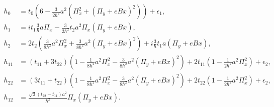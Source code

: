 \documentclass{report}
\newcommand{\f}[2]{\dfrac{#1}{#2}}
\begin{document}
\begin{equation}
	\begin{aligned}
		h_{0}  & = t_{0} (6 - \frac{3}{2\hbar^{2}} a^{2} (\Pi_{x}^{2} + (\Pi_{y} + e Bx)^{2})) + \epsilon_{1}  ,                                                                                          \\
		h_{1}  & = i t_{1} \frac{3}{\hbar}a \Pi_{x} - \frac{3}{2\hbar^{2}} t_{2} a^{2} \Pi_{x}(\Pi_{y} + eBx)       ,                                                                                     \\
		h_{2}  & = 2 t_{2} (\frac{3}{8\hbar^{2}} a^{2} \Pi_{x}^{2} + \frac{3}{8\hbar^{2}} a^{2} (\Pi_{y} + eBx)^{2}) + i \frac{3}{\hbar} t_{1} a (\Pi_{y} + eBx)     ,                                    \\
		h_{11} & = (t_{11} + 3 t_{22}) (1 - \frac{1}{8\hbar^{2}}a^{2} \Pi_{x}^{2} - \frac{3}{8\hbar^{2}}a^{2} (\Pi_{y} + eBx)^{2}) + 2 t_{11}(1 - \frac{1}{2\hbar^{2}} a^{2} \Pi_{x}^{2}) + \epsilon_{2}, \\
		h_{22} & = (3 t_{11} + t_{22}) (1 - \frac{1}{8\hbar^{2}}a^{2} \Pi_{x}^{2} - \frac{3}{8\hbar^{2}}a^{2} (\Pi_{y} + eBx)^{2}) + 2 t_{22}(1 - \frac{1}{2\hbar^{2}} a^{2} \Pi_{x}^{2}) + \epsilon_{2}, \\
		h_{12} & = \frac{\sqrt{3} (t_{22} - t_{11}) a^{2}}{\hbar^{2}} \Pi_{x} (\Pi_{y} + eBx).
	\end{aligned}
\end{equation}
\end{document}
